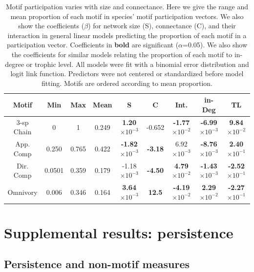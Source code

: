 \documentclass[12pt]{article}
\begin{document}
\begin{spacing}{2.0}
    \begin{table}[hb!]
        \centering
        \caption{Motif participation varies with size and connectance. Here we give the range and mean proportion of each motif in species' motif participation vectors. 
        We also show the coefficients ($\beta$) for network size (S), connectance (C), and their interaction in general linear models predicting the proportion of each motif in a participation vector.
        Coefficients in \textbf{bold} are significant ($\alpha$=0.05).
        We also show the coefficients for similar models relating the proportion of each motif to in-degree or trophic level.
        All models were fit with a binomial error distribution and logit link function.
        Predictors were not centered or standardized before model fitting. Motifs are ordered according to mean proportion.}
        \label{tab:partic_vs_SC}   
        \footnotesize
        \begin{tabular}{c|c c c | c c c | c | c}
            Motif & Min & Max & Mean & S & C & Int. & in-Deg & TL \\
            \hline
            3-sp Chain & 0 & 1 & 0.249 & \textbf{1.20$\times10^{-3}$} &  -0.652 & \textbf{-1.77$\times10^{-2}$} & \textbf{-6.99$\times10^{-3}$} & \textbf{9.84$\times10^{-2}$} \\
            App. Comp & 0.250 & 0.765 & 0.422 & \textbf{-1.82$\times10^{-3}$} & \textbf{-3.18} & 6.92$\times10^{-3}$ & \textbf{-8.76$\times10^{-3}$} & \textbf{2.40$\times10^{-1}$}\\
            Dir. Comp & 0.0501 & 0.359 & 0.179 & -1.18$\times10^{-3}$ & \textbf{-4.50} & \textbf{4.79$\times10^{-2}$} & \textbf{-1.43$\times10^{-3}$} & \textbf{-2.52$\times10^{-1}$} \\
            Omnivory & 0.006 & 0.346 & 0.164 & \textbf{3.64$\times10^{-3}$} & \textbf{12.5} & \textbf{-4.19$\times10^{-2}$} & \textbf{2.29$\times10^{-2}$} & \textbf{-2.27$\times10^{-1}$}\\   
            \hline
            \end{tabular}
            \end{table}


\clearpage 

\section{Supplemental results: persistence} 

    \subsection{Persistence and non-motif measures}


\end{spacing}
\end{document}
